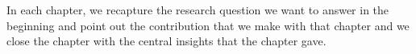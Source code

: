 In each chapter, we recapture the research question we want to answer in the beginning and point out the contribution that we make with that chapter and we close the chapter with the central insights that the chapter gave.








